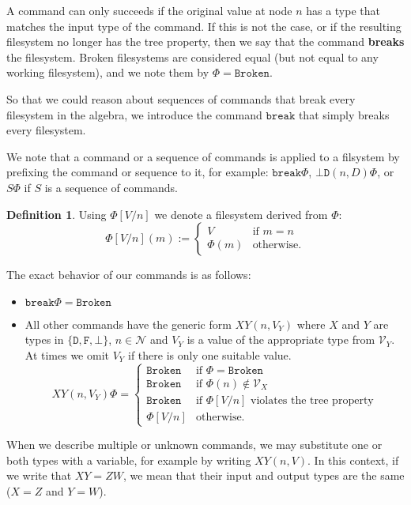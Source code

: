 \documentclass[12pt]{article}
\newcommand{\setvx}[1]{\mathcal{V}_{#1}}
\newcommand{\setn}{\mathcal{N}} %
\newcommand{\empt}{\bot}
\newcommand{\fsbroken}{\mathtt{Broken}} %
\newcommand{\FS}{\Phi} %
\newcommand{\cbrk}{\mathtt{break}}
\newcommand{\fscommand}[2]{{#1#2}}
\newcommand{\fsregcommandchar}[1]{\mathtt{#1}}
\newcommand{\fsregcommand}[2]{\fscommand{\fsregcommandchar{#1}}{\fsregcommandchar{#2}}}
\newcommand{\cbd}{\fsregcommand{\empt}{D}}
\newcommand{\cxy}{\fscommand{X}{Y}}
\newcommand{\czw}{\fscommand{Z}{W}}
\newcommand{\typeset}{\{\fsregcommandchar{D},\fsregcommandchar{F},\empt\}} %
\theoremstyle{definition}
\newtheorem{mydef}{Definition}
\begin{document}
A command can only succeeds if the original value at node $n$ has a type that matches
the input type of the command. If this is not the case, or if the resulting
filesystem no longer has the tree property, then we say that the command
\textbf{breaks} the filesystem. Broken filesystems are considered equal
(but not equal to any working filesystem), and we note them by $\FS=\fsbroken$.

So that we could reason about sequences of commands that break every filesystem
in the algebra, we introduce the command $\cbrk$ that simply breaks every filesystem.

We note that a command or a sequence of commands is applied to a filsystem
by prefixing the command or sequence to it, for example: $\cbrk\FS$, $\cbd(n,D)\FS$, 
or $S\FS$ if $S$ is a sequence of commands.

\begin{mydef}
Using $\FS[V/n]$ we denote a filesystem derived from $\FS$:
\[ \FS[V/n](m) :=
   \begin{cases}
   V &\mbox{if~} m=n\\
   \FS(m) &\mbox{otherwise.}
   \end{cases}
\]
\end{mydef}

The exact behavior of our commands is as follows:
\begin{itemize}
\item $\cbrk\FS = \fsbroken$
\item
All other commands have the generic form $\cxy(n,V_Y)$ where
$X$ and $Y$ are types in $\typeset$,
$n\in\setn$ and $V_Y$ is a value of the appropriate type from $\setvx{Y}$.
At times we omit $V_Y$ if there is only one suitable value.
\[ \cxy(n,V_Y)\FS = 
   \begin{cases}
   \fsbroken &\mbox{if~} \FS=\fsbroken\\
   \fsbroken &\mbox{if~} \FS(n)\not\in\setvx{X}\\
   \fsbroken &\mbox{if~} \FS[V/n] \mbox{~violates the tree property}\\
   \FS[V/n] &\mbox{otherwise.}
   \end{cases}
\]
\end{itemize}


When we describe multiple or unknown commands, we may substitute one or both
types with a variable, for example by writing $\cxy(n,V)$. In this context,
if we write that $\cxy=\czw$, we mean that their input and output types
are the same ($X=Z$ and $Y=W$).
\end{document}
